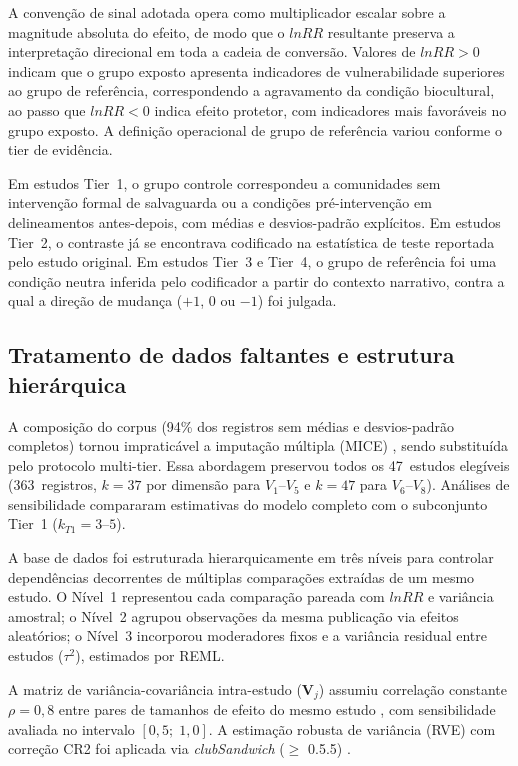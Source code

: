 \documentclass[12pt,a4paper]{article}
\begin{document}
A convenção de sinal adotada opera como multiplicador escalar sobre a magnitude absoluta do efeito, de modo que o $lnRR$ resultante preserva a interpretação direcional em toda a cadeia de conversão. Valores de $lnRR > 0$ indicam que o grupo exposto apresenta indicadores de vulnerabilidade superiores ao grupo de referência, correspondendo a agravamento da condição biocultural, ao passo que $lnRR < 0$ indica efeito protetor, com indicadores mais favoráveis no grupo exposto. A definição operacional de grupo de referência variou conforme o tier de evidência. 

Em estudos Tier~1, o grupo controle correspondeu a comunidades sem intervenção formal de salvaguarda ou a condições pré-intervenção em delineamentos antes-depois, com médias e desvios-padrão explícitos. Em estudos Tier~2, o contraste já se encontrava codificado na estatística de teste reportada pelo estudo original. Em estudos Tier~3 e Tier~4, o grupo de referência foi uma condição neutra inferida pelo codificador a partir do contexto narrativo, contra a qual a direção de mudança ($+1$, $0$ ou $-1$) foi julgada.

\subsection{Tratamento de dados faltantes e estrutura hierárquica}
\label{sec:missing}

A composição do corpus (94\% dos registros sem médias e desvios-padrão completos) tornou impraticável a imputação múltipla (MICE) \citep{vanBuuren2011}, sendo substituída pelo protocolo multi-tier. Essa abordagem preservou todos os 47~estudos elegíveis (363~registros, $k = 37$ por dimensão para $V_1$--$V_5$ e $k = 47$ para $V_6$--$V_8$). Análises de sensibilidade compararam estimativas do modelo completo com o subconjunto Tier~1 ($k_{T1} = 3\text{--}5$).

A base de dados foi estruturada hierarquicamente em três níveis \citep{Pustejovsky2022} para controlar dependências decorrentes de múltiplas comparações extraídas de um mesmo estudo. O Nível~1 representou cada comparação pareada com $lnRR$ e variância amostral; o Nível~2 agrupou observações da mesma publicação via efeitos aleatórios; o Nível~3 incorporou moderadores fixos e a variância residual entre estudos ($\tau^2$), estimados por REML. 

A matriz de variância-covariância intra-estudo ($\mathbf{V}_j$) assumiu correlação constante $\rho = 0{,}8$ entre pares de tamanhos de efeito do mesmo estudo \citep{Pustejovsky2022}, com sensibilidade avaliada no intervalo $[0{,}5;\; 1{,}0]$. A estimação robusta de variância (RVE) com correção CR2 foi aplicada via \textit{clubSandwich} ($\geq$ 0.5.5) \citep{Pustejovsky2022}.
\end{document}
